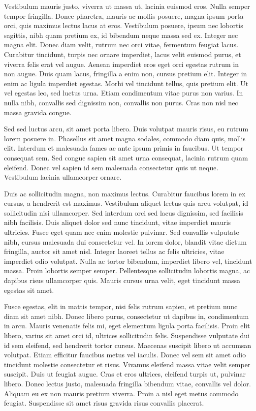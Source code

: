 Vestibulum mauris justo, viverra ut massa ut, lacinia euismod eros.
Nulla semper tempor fringilla. Donec pharetra, mauris ac mollis
posuere, magna ipsum porta orci, quis maximus lectus lacus at eros.
Vestibulum posuere, ipsum nec lobortis sagittis, nibh quam pretium ex,
id bibendum neque massa sed ex. Integer nec magna elit. Donec diam
velit, rutrum nec orci vitae, fermentum feugiat lacus. Curabitur
tincidunt, turpis nec ornare imperdiet, lacus velit euismod purus, et
viverra felis erat vel augue. Aenean imperdiet eros eget orci egestas
rutrum in non augue. Duis quam lacus, fringilla a enim non, cursus
pretium elit. Integer in enim ac ligula imperdiet egestas. Morbi vel
tincidunt tellus, quis pretium elit. Ut vel egestas leo, sed luctus
urna. Etiam condimentum vitae purus non varius. In nulla nibh,
convallis sed dignissim non, convallis non purus. Cras non nisl nec
massa gravida congue. 

Sed sed luctus arcu, sit amet porta libero. Duis volutpat mauris
risus, eu rutrum lorem posuere in. Phasellus sit amet magna sodales,
commodo diam quis, mollis elit. Interdum et malesuada fames ac ante
ipsum primis in faucibus. Ut tempor consequat sem. Sed congue sapien
sit amet urna consequat, lacinia rutrum quam eleifend. Donec vel
sapien id sem malesuada consectetur quis ut neque. Vestibulum lacinia
ullamcorper ornare. 

Duis ac sollicitudin magna, non maximus lectus. Curabitur faucibus
lorem in ex cursus, a hendrerit est maximus. Vestibulum aliquet lectus
quis arcu volutpat, id sollicitudin nisi ullamcorper. Sed interdum
orci sed lacus dignissim, sed facilisis nibh facilisis. Duis aliquet
dolor sed nunc tincidunt, vitae imperdiet mauris ultricies. Fusce eget
quam nec enim molestie pulvinar. Sed convallis vulputate nibh, cursus
malesuada dui consectetur vel. In lorem dolor, blandit vitae dictum
fringilla, auctor sit amet nisl. Integer laoreet tellus ac felis
ultricies, vitae imperdiet odio volutpat. Nulla ac tortor bibendum,
imperdiet libero vel, tincidunt massa. Proin lobortis semper semper.
Pellentesque sollicitudin lobortis magna, ac dapibus risus ullamcorper
quis. Mauris cursus urna velit, eget tincidunt massa egestas sit amet. 

Fusce egestas, elit in mattis tempor, nisi felis rutrum sapien, et
pretium nunc diam sit amet nibh. Donec libero purus, consectetur ut
dapibus in, condimentum in arcu. Mauris venenatis felis mi, eget
elementum ligula porta facilisis. Proin elit libero, varius sit amet
orci id, ultrices sollicitudin felis. Suspendisse vulputate dui id sem
eleifend, sed hendrerit tortor cursus. Maecenas suscipit libero ut
accumsan volutpat. Etiam efficitur faucibus metus vel iaculis. Donec
vel sem sit amet odio tincidunt molestie consectetur et risus. Vivamus
eleifend massa vitae velit semper suscipit. Duis ut feugiat augue.
Cras et eros ultrices, eleifend turpis ut, pulvinar libero. Donec
lectus justo, malesuada fringilla bibendum vitae, convallis vel dolor.
Aliquam eu ex non mauris pretium viverra. Proin a nisl eget metus
commodo feugiat. Suspendisse sit amet risus gravida risus convallis
placerat.

